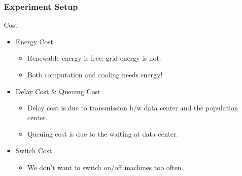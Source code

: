 \documentclass{beamer}
\begin{document}
%
%
\begin{frame}
\frametitle{Experiment Setup}
\begin{block}
{Cost}
\begin{itemize}
\item
Energy Cost
	\begin{itemize}
	\item
	Renewable energy is free; grid energy is not.
	\item
	Both computation and cooling needs energy!
	\end{itemize}
\item
Delay Cost \& Queuing Cost
	\begin{itemize}
	\item
	Delay cost is due to transmission b/w data center and the population center.
	\item
	Queuing cost is due to the waiting at data center.
	\end{itemize}
\item
Switch Cost
	\begin{itemize}
	\item
	We don't want to switch on/off machines too often.
	\end{itemize}
\end{itemize}
\end{block}
\end{frame}
\end{document}
